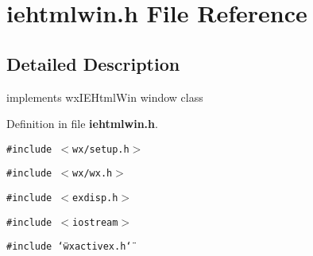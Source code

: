 \section{iehtmlwin.h File Reference}
\label{iehtmlwin_8h}


\subsection{Detailed Description}
implements wx\-IEHtml\-Win window class



Definition in file {\bf iehtmlwin.h}.

{\tt \#include $<$wx/setup.h$>$}\par
{\tt \#include $<$wx/wx.h$>$}\par
{\tt \#include $<$exdisp.h$>$}\par
{\tt \#include $<$iostream$>$}\par
{\tt \#include \char`\"{}wxactivex.h\char`\"{}}\par

